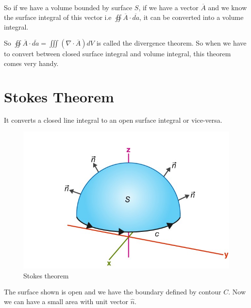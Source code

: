 
So if we have a volume bounded by surface $S$, if we have a vector $\overline{A}$ and we know the surface integral of this vector i.e $\oiint \overline{A}\cdot\overline{da}$, it can be converted into a volume integral.


So $\oiint \overline{A} \cdot \overline{da} = \iiint (\nabla \cdot \overline{A})dV$ is called the divergence theorem. So when we have to convert between closed surface integral and volume integral, this theorem comes very handy.

\section{Stokes Theorem}
It converts a closed line integral to an open surface integral or vice-versa.


\begin{figure}
	\centering
	\includegraphics[width=0.7\linewidth]{./graphics/fig17.8}
	\caption{Stokes theorem}
\end{figure}
 

The surface shown is open and we have the boundary defined by contour $C$. Now we can have a small area with unit vector $\hat n$.

